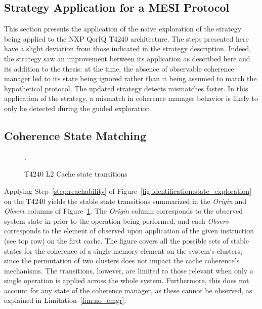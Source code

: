 \subsection{Strategy Application for a MESI Protocol}
\label{sec:identification:application}
This section presents the application of the naive exploration of the strategy
being applied to the NXP QorIQ T4240 architecture. The steps presented here have
a slight deviation from those indicated in the strategy description. Indeed, the
strategy saw an improvement between its application as described here and its
addition to the thesis: at the time, the absence of observable coherence manager
led to its state being ignored rather than it being assumed to match the
hypothetical protocol. The updated strategy detects mismatches faster. In this
application of the strategy, a mismatch in coherence manager behavior is likely
to only be detected during the guided exploration.

\subsection{Coherence State Matching}
\begin{figure}[hbt]

\caption{T4240 L2 Cache state transitions}
\label{fig:identification:state_transitions}.
\end{figure}

Applying Step~\ref{step:reachability} of
Figure~\ref{fig:identification:state_exploration} on the T4240 yields the
stable state transitions summarized in the \textit{Origin} and \textit{Observ}
columns of Figure~\ref{fig:identification:state_transitions}. The
\textit{Origin} column corresponds to the observed system state in
\obssystemstate{} prior to the operation being performed, and each
\textit{Observ} corresponds to the element of \obssystemstate{} observed upon
application of the given instruction (see top row) on the first cache. The
figure covers all the possible sets of stable states for the coherence of a
single memory element on the system's clusters, since the permutation of two
clusters does not impact the cache coherence's mechanisms. The transitions,
however, are limited to those relevant when only a single operation is applied
across the whole system. Furthermore, this does not account for any state of
the coherence manager, as these cannot be observed, as explained in
Limitation~\ref{lim:no_cmgr}.

